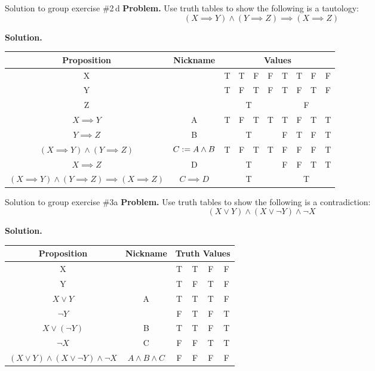 \documentclass[10pt]{beamer}
\begin{document}
\begin{frame}{Solution to group exercise \#2\,d}
\footnotesize 
\textbf{Problem.} Use truth tables to show the following is a tautology:
\[ (X \implies Y) \land (Y \implies Z) \implies (X \implies Z) \]

\vfill 
\textbf{Solution.}
\begin{table}[h]
    \centering
    \begin{tabular}{cc|c c c c |c c c c}
        \toprule 
        \textbf{Proposition} & \textbf{Nickname} & \multicolumn{8}{c}{\textbf{Values}} \\
        \midrule
        X &&T&T&F&F&T&T&F&F \\
        Y &&T&F&T&F&T&F&T&F \\
        Z && \multicolumn{4}{c}{\cellcolor[gray]{0.9} T} &  \multicolumn{4}{c}{ \cellcolor[gray]{0.7} F}\\  
        \midrule
        $X \implies Y$&A &T&F&T&T&T&F&T&T \\
        $Y \implies Z$&B &\multicolumn{4}{c}{\cellcolor[gray]{0.9} T}&F&T&F&T \\
        $(X \implies Y) \land (Y \implies Z)$ &$C := A \land B$ &T&F&T&T&F&F&F&T \\
        $X \implies Z$ &D &\multicolumn{4}{c}{\cellcolor[gray]{0.9} T} & F & F & T & T \\
         \tiny $(X \implies Y) \land (Y \implies Z) \implies (X \implies Z)$ &$C \implies D$&\multicolumn{4}{c}{\cellcolor[gray]{0.9} T} &  \multicolumn{4}{c}{ \cellcolor[gray]{0.7} T}\\
        \bottomrule
    \end{tabular}
\end{table}	
\end{frame}

\begin{frame}{Solution to group exercise \#3a}
\footnotesize 
\textbf{Problem.} Use truth tables to show the following is a contradiction:
\[ (X \lor Y) \land (X \lor \lnot Y) \land \lnot X \]

\vfill 
\textbf{Solution.}
\begin{table}[h]
    \centering
    \begin{tabular}{c | c|c c c c}
        \toprule 
        \textbf{Proposition} & \textbf{Nickname}& \multicolumn{4}{c}{\textbf{Truth Values}} \\
        \midrule
        X &&T&T&F&F\\
        Y &&T&F&T&F\\ 
        \midrule
        $X \lor Y$&A&T&T&T&F\\
        \midrule 
        $\lnot Y$ &&F&T&F&T \\
        $X \lor (\lnot Y)$&B &T&T&F&T \\
        \midrule 
        $\lnot X$&C &F&F&T&T \\
        $(X \lor Y) \land (X \lor \lnot Y) \land \lnot X$ & $A \land B \land C$ &F&F&F&F \\
        \bottomrule
    \end{tabular}
\end{table}	
\end{frame}
\end{document}
